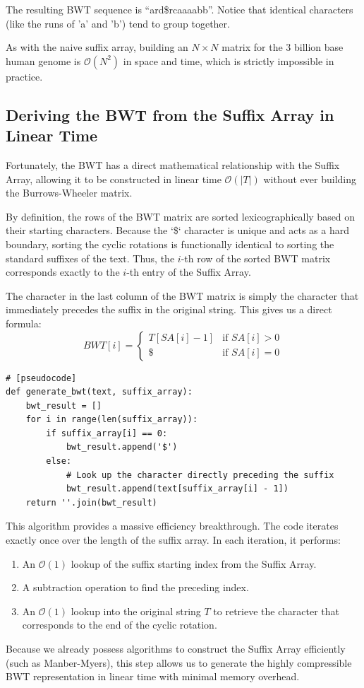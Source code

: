 The resulting BWT sequence is ``ard\$rcaaaabb''. Notice that identical characters (like the runs of 'a' and 'b') tend to group together.

\sta As with the naive suffix array, building an \( N \times N \) matrix for the 3 billion base human genome is \( \mathcal{O}(N^2) \) in space and time, which is strictly impossible in practice. 

\subsection{Deriving the BWT from the Suffix Array in Linear Time}

Fortunately, the BWT has a direct mathematical relationship with the Suffix Array, allowing it to be constructed in linear time \( \mathcal{O}(|T|) \) without ever building the Burrows-Wheeler matrix.

By definition, the rows of the BWT matrix are sorted lexicographically based on their starting characters. Because the `\$` character is unique and acts as a hard boundary, sorting the cyclic rotations is functionally identical to sorting the standard suffixes of the text. 
Thus, the \( i \)-th row of the sorted BWT matrix corresponds exactly to the \( i \)-th entry of the Suffix Array.

The character in the last column of the BWT matrix is simply the character that immediately precedes the suffix in the original string. This gives us a direct formula:
\[
BWT[i] = 
\begin{cases} 
T[SA[i] - 1] & \text{if } SA[i] > 0 \\
\$ & \text{if } SA[i] = 0 
\end{cases}
\]

\begin{verbatim}
# [pseudocode]
def generate_bwt(text, suffix_array):
    bwt_result = []
    for i in range(len(suffix_array)):
        if suffix_array[i] == 0:
            bwt_result.append('$')
        else:
            # Look up the character directly preceding the suffix
            bwt_result.append(text[suffix_array[i] - 1])
    return ''.join(bwt_result)
\end{verbatim}

This algorithm provides a massive efficiency breakthrough. The code iterates exactly once over the length of the suffix array. In each iteration, it performs:
\begin{enumerate}
    \item An \( \mathcal{O}(1) \) lookup of the suffix starting index from the Suffix Array.
    \item A subtraction operation to find the preceding index.
    \item An \( \mathcal{O}(1) \) lookup into the original string \( T \) to retrieve the character that corresponds to the end of the cyclic rotation.
\end{enumerate}
Because we already possess algorithms to construct the Suffix Array efficiently (such as Manber-Myers), this step allows us to generate the highly compressible BWT representation in linear time with minimal memory overhead.

